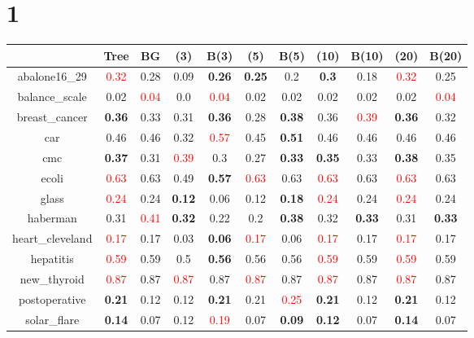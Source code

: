 \documentclass{article}%
\begin{document}
\section*{1}%
\begin{tabular}{c|cccccccccc}%
\hline%
&Tree&BG&(3)&B(3)&(5)&B(5)&(10)&B(10)&(20)&B(20)\\%
\hline%
abalone16\_29&\textcolor{red}{ 
0.32
}&0.28&0.09&\textbf{0.26}&\textbf{0.25}&0.2&\textbf{0.3}&0.18&\textcolor{red}{ 
0.32
}&0.25\\%
\hline%
balance\_scale&0.02&\textcolor{red}{ 
0.04
}&0.0&\textcolor{red}{ 
0.04
}&0.02&0.02&0.02&0.02&0.02&\textcolor{red}{ 
0.04
}\\%
\hline%
breast\_cancer&\textbf{0.36}&0.33&0.31&\textbf{0.36}&0.28&\textbf{0.38}&0.36&\textcolor{red}{ 
0.39
}&\textbf{0.36}&0.32\\%
\hline%
car&0.46&0.46&0.32&\textcolor{red}{ 
0.57
}&0.45&\textbf{0.51}&0.46&0.46&0.46&0.46\\%
\hline%
cmc&\textbf{0.37}&0.31&\textcolor{red}{ 
0.39
}&0.3&0.27&\textbf{0.33}&\textbf{0.35}&0.33&\textbf{0.38}&0.35\\%
\hline%
ecoli&\textcolor{red}{ 
0.63
}&0.63&0.49&\textbf{0.57}&\textcolor{red}{ 
0.63
}&0.63&\textcolor{red}{ 
0.63
}&0.63&\textcolor{red}{ 
0.63
}&0.63\\%
\hline%
glass&\textcolor{red}{ 
0.24
}&0.24&\textbf{0.12}&0.06&0.12&\textbf{0.18}&\textcolor{red}{ 
0.24
}&0.24&\textcolor{red}{ 
0.24
}&0.24\\%
\hline%
haberman&0.31&\textcolor{red}{ 
0.41
}&\textbf{0.32}&0.22&0.2&\textbf{0.38}&0.32&\textbf{0.33}&0.31&\textbf{0.33}\\%
\hline%
heart\_cleveland&\textcolor{red}{ 
0.17
}&0.17&0.03&\textbf{0.06}&\textcolor{red}{ 
0.17
}&0.06&\textcolor{red}{ 
0.17
}&0.17&\textcolor{red}{ 
0.17
}&0.17\\%
\hline%
hepatitis&\textcolor{red}{ 
0.59
}&0.59&0.5&\textbf{0.56}&0.56&0.56&\textcolor{red}{ 
0.59
}&0.59&\textcolor{red}{ 
0.59
}&0.59\\%
\hline%
new\_thyroid&\textcolor{red}{ 
0.87
}&0.87&\textcolor{red}{ 
0.87
}&0.87&\textcolor{red}{ 
0.87
}&0.87&\textcolor{red}{ 
0.87
}&0.87&\textcolor{red}{ 
0.87
}&0.87\\%
\hline%
postoperative&\textbf{0.21}&0.12&0.12&\textbf{0.21}&0.21&\textcolor{red}{ 
0.25
}&\textbf{0.21}&0.12&\textbf{0.21}&0.12\\%
\hline%
solar\_flare&\textbf{0.14}&0.07&0.12&\textcolor{red}{ 
0.19
}&0.07&\textbf{0.09}&\textbf{0.12}&0.07&\textbf{0.14}&0.07\\%

\end{tabular}
\end{document}
